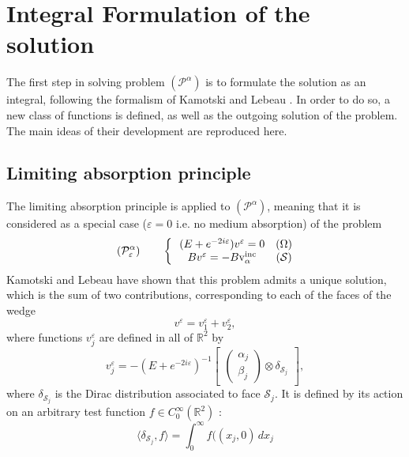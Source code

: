 \section{Integral Formulation of the solution}
\label{C3:intformulation}
The first step in solving problem $(\mathcal{P}^{\alpha})$ is to formulate the solution as an integral, following the formalism of Kamotski and Lebeau \cite{KamotskiLebeau}. In order to do so, a new class of functions is defined, as well as the outgoing solution of the problem. The main ideas of their development are reproduced here.
\subsection{Limiting absorption principle}
The limiting absorption principle is applied to $(\mathcal{P}^{\alpha})$, meaning that it is considered as a special case ($\varepsilon=0$ i.e. no medium absorption) of the problem
\begin{equation}
(\mathcal{P}^{\alpha}_{\varepsilon}) \hspace{2em} \left\{~~
\begin{matrix}
(E+e^{-2i\varepsilon})v^{\varepsilon}=0 & (\Omega) \\
Bv^{\varepsilon}=-B \rm v_{\alpha}^{inc} & (\mathcal{S})
\end{matrix}
\right.
\label{Pabs}
\end{equation}
Kamotski and Lebeau \cite{KamotskiLebeau} have shown that this problem admits a unique solution, which is the sum of two contributions, corresponding to each of the faces of the wedge
\begin{equation}
v^{\varepsilon}=v_1^{\varepsilon}+v_2^{\varepsilon},
\label{v1+v2}
\end{equation}
where functions $v_j^{\varepsilon}$ are defined in all of $\mathbb{R}^2$ by
\begin{equation}
v_j^{\varepsilon}=-(E+e^{-2i\varepsilon})^{-1} \begin{bmatrix}
\begin{pmatrix}
\alpha_j \\
\beta_j
\end{pmatrix}
\otimes \delta_{\mathcal{S}_j}
\end{bmatrix},
\label{vjdef}
\end{equation}
where $\delta_{\mathcal{S}_j}$ is the Dirac distribution associated to face $\mathcal{S}_j$. It is defined by its action on an arbitrary test function $f \in C_0^{\infty}(\mathbb{R}^2)$ :
\begin{equation}
\langle \delta_{\mathcal{S}_j},f\rangle=\int_0^{\infty}f((x_j,0)\, dx_j
\label{defDirac}
\end{equation}

